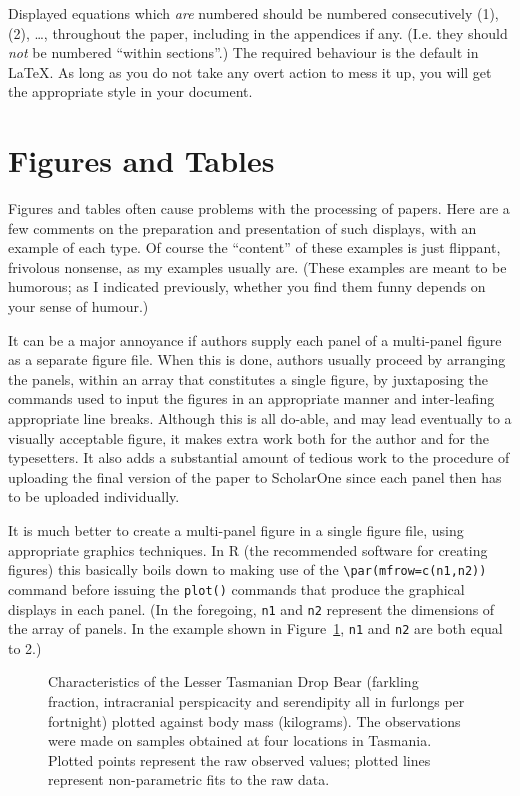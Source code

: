 \documentclass[times, doublespace]{anzsauth}
\begin{document}
\noindent
Displayed equations which \emph{are} numbered should be numbered
consecutively (1), (2), \ldots, throughout the paper, including
in the appendices if any.  (I.e. they should \emph{not} be numbered
``within sections''.)  The required behaviour is the default in
\LaTeX.  As long as you do not take any overt action to mess it up,
you will get the appropriate style in your document.

\section{Figures and Tables}
\label{sec:figAndTab}

Figures and tables often cause problems with the processing
of papers.  Here are a few comments on the preparation and
presentation of such displays, with an example of each type.
Of course the ``content'' of these examples is just flippant,
frivolous nonsense, as my examples usually are.  (These examples
are meant to be humorous; as I indicated previously, whether you
find them funny depends on your sense of humour.)

It can be a major annoyance if authors supply each panel of a
multi-panel figure as a separate figure file.  When this is done,
authors usually proceed by arranging the panels, within an array
that constitutes a single figure, by juxtaposing the commands used
to input the figures in an appropriate manner and inter-leafing
appropriate line breaks.  Although this is all do-able, and may
lead eventually to a visually acceptable figure, it makes extra
work both for the author and for the typesetters.  It also adds a
substantial amount of tedious work to the procedure of uploading
the final version of the paper to ScholarOne since each panel then
has to be uploaded individually.

It is much better to create a multi-panel figure in a single figure
file, using appropriate graphics techniques.  In \textsf{R} (the
recommended software for creating figures) this basically boils
down to making use of the \verb!\par(mfrow=c(n1,n2))! command
before issuing the \texttt{plot()} commands that produce the
graphical displays in each panel.  (In the foregoing, \texttt{n1}
and \texttt{n2} represent the dimensions of the array of panels.
In the example shown in Figure~\ref{fig:ltdb}, \texttt{n1} and
\texttt{n2} are both equal to 2.)

\begin{figure}[htp]
\centering
{}
\caption{\label{fig:ltdb}
Characteristics of the Lesser Tasmanian Drop Bear (farkling
fraction, intracranial perspicacity and serendipity all in
furlongs per fortnight) plotted against body mass (kilograms).
The observations were made on samples obtained at four locations
in Tasmania. Plotted points represent the raw observed values;
plotted lines represent non-parametric fits to the raw data.}
\end{figure}
\end{document}
